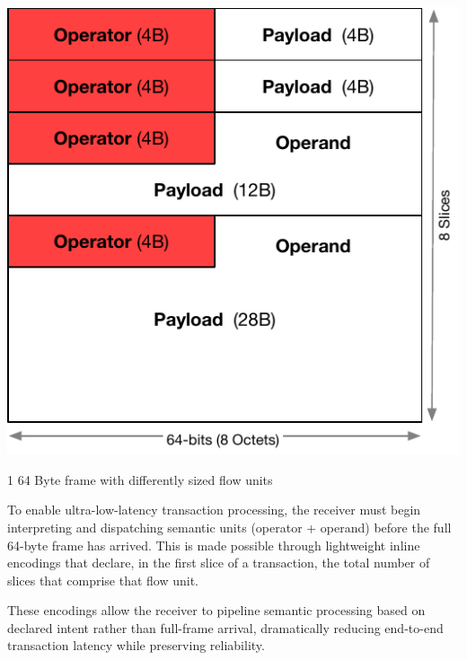 \documentclass[../../../OAE-SPEC-MAIN.tex]{subfiles}
\begin{document}
\begin{marginfigure}
  \includegraphics[width=\linewidth]{./figures/Mixed-1-2-4-slice-flowtransactions.pdf}
  \caption{1 64 Byte frame with differently sized flow units}
  \vspace{8pt}
\end{marginfigure}



To enable ultra-low-latency transaction processing, the receiver must begin interpreting and dispatching semantic units (operator + operand) before the full 64-byte frame has arrived. This is made possible through lightweight inline encodings that declare, in the first slice of a transaction, the total number of slices that comprise that flow unit.

These encodings allow the receiver to pipeline semantic processing based on declared intent rather than full-frame arrival, dramatically reducing end-to-end transaction latency while preserving reliability.

\end{document}
